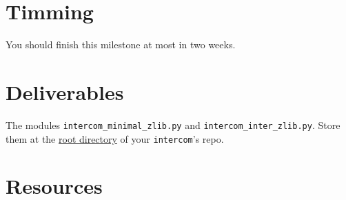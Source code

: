 \section{Timming}

You should finish this milestone at most in two weeks.

\section{Deliverables}

The modules \texttt{intercom\_minimal\_zlib.py} and
\texttt{intercom\_inter\_zlib.py}. Store them at the
\href{https://github.com/Tecnologias-multimedia/intercom}{root
  directory} of your \texttt{intercom}'s repo.

\section{Resources}



